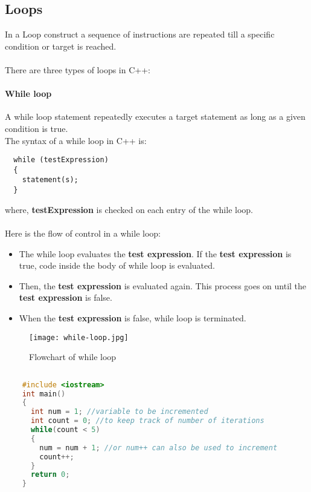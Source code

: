 \documentclass[11pt,fleqn]{book} %
\begin{document}
\subsection{Loops}
In a Loop construct a sequence of instructions are repeated till a specific condition or target is reached. ~\\ ~\\
There are three types of loops in C++: 
\paragraph{While loop}
A while loop statement repeatedly executes a target statement as long as a given condition is true. ~\\
The syntax of a while loop in C++ is:
\begin{lstlisting}
  while (testExpression) 
  {
    statement(s);
  }
\end{lstlisting}
where, \textbf{testExpression} is checked on each entry of the while loop.
~\\ \\
Here is the flow of control in a while loop: \\
\begin{itemize}
\item The while loop evaluates the \textbf{test expression}.
  If the \textbf{test expression} is true, code inside the body of while loop is evaluated.
\item Then, the \textbf{test expression} is evaluated again. This process goes on until the \textbf{test expression} is false.
\item When the \textbf{test expression} is false, while loop is terminated.
\end{itemize}
\begin{figure}[H]
  \centering
  \texttt{[image: while-loop.jpg]}
  \caption{Flowchart of while loop}
\end{figure}
\begin{example}
  \begin{lstlisting}[language=C++, caption = Using While loop to increment an integer 5 times]
    
    #include <iostream>
    int main()
    {
      int num = 1; //variable to be incremented
      int count = 0; //to keep track of number of iterations
      while(count < 5)
      {
        num = num + 1; //or num++ can also be used to increment
        count++;
      }
      return 0;
    }
  \end{lstlisting}
\end{example}
\end{document}
